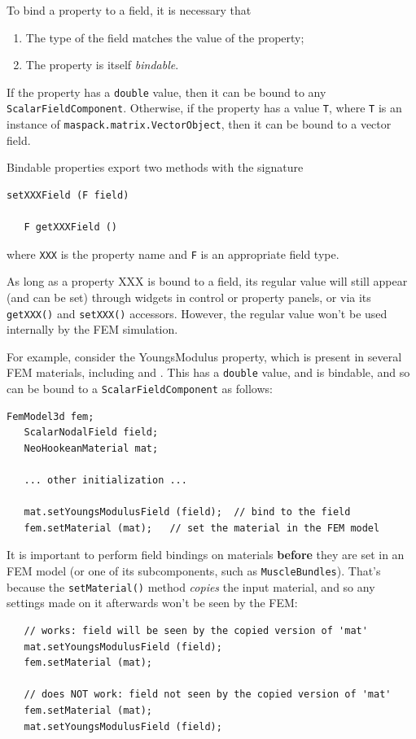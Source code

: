 To bind a property to a field, it is necessary that 

\begin{enumerate}

\item The type of the field matches the value of the property;

\item The property is itself {\it bindable}.

\end{enumerate}

If the property has a {\tt double} value, then it can be bound to any
{\tt ScalarFieldComponent}. Otherwise, if the property has a value {\tt T},
where {\tt T} is an instance of {\tt maspack.matrix.VectorObject},
then it can be bound to a vector field.

Bindable properties export two methods with the signature
%
\begin{lstlisting}[]
   setXXXField (F field)

   F getXXXField ()
\end{lstlisting}
%
where {\tt XXX} is the property name and {\tt F} is an appropriate
field type. 
%
\begin{sideblock}
As long as a property {\sf XXX} is bound to a field, its regular value will
still appear (and can be set) through widgets in control or property
panels, or via its {\tt getXXX()} and {\tt setXXX()} accessors.
However, the regular value won't be used internally by the FEM
simulation.
\end{sideblock}
%
For example, consider the {\sf YoungsModulus} property, which is
present in several FEM materials, including
 and
.
This has a {\tt double} value, and is bindable, and so can be bound to
a {\tt ScalarFieldComponent} as follows:
%
\begin{lstlisting}[]
   FemModel3d fem;
   ScalarNodalField field;
   NeoHookeanMaterial mat;
  
   ... other initialization ...

   mat.setYoungsModulusField (field);  // bind to the field
   fem.setMaterial (mat);   // set the material in the FEM model
\end{lstlisting}
%
\begin{sideblock}
It is important to perform field bindings on materials {\bf before} 
they are set in an FEM model (or one of its subcomponents, such
as {\tt MuscleBundles}). That's because the {\tt setMaterial()} method
{\it copies} the input material, and so any settings made on it
afterwards won't be seen by the FEM:
\begin{verbatim}
   // works: field will be seen by the copied version of 'mat'
   mat.setYoungsModulusField (field); 
   fem.setMaterial (mat);

   // does NOT work: field not seen by the copied version of 'mat'
   fem.setMaterial (mat);
   mat.setYoungsModulusField (field); 
\end{verbatim}
\end{sideblock}

